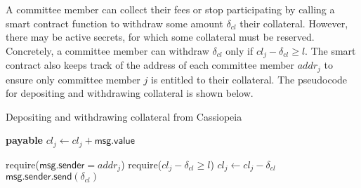 A committee member can collect their fees or stop participating by calling a smart contract function to withdraw some amount $\delta_{cl}$ their collateral.
However, there may be active secrets, for which some collateral must be reserved.
Concretely, a committee member can withdraw $\delta_{cl}$ only if $cl_j - \delta_{cl} \geq l$.
The smart contract also keeps track of the address of each committee member $addr_j$ to ensure only committee member $j$ is entitled to their collateral.
The pseudocode for depositing and withdrawing collateral is shown below.

\begin{algorithm}[H]
\caption{Depositing and withdrawing collateral from Cassiopeia}
    \begin{algorithmic}[1]
         \textbf{payable}
            \State $cl_j \gets cl_j + \textsf{msg.value}$
        \EndFunction

            \State require($\textsf{msg.sender} = addr_j$)
            \State require($cl_j - \delta_{cl} \geq l$)
            \State $cl_j \gets cl_j - \delta_{cl}$
            \State $\textsf{msg.sender.send}(\delta_{cl})$
        \EndFunction
    \end{algorithmic}
\end{algorithm}


